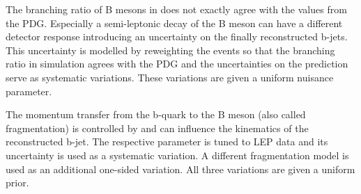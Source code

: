 The branching ratio of B mesons in \PYTHIA does not exactly agree with the values from the PDG. Especially a semi-leptonic decay of the B meson can have a different detector response introducing an uncertainty on
the finally reconstructed b-jets. This uncertainty is modelled by reweighting the events so that the branching ratio in simulation agrees with the PDG and the uncertainties on the prediction serve as systematic
variations. These variations are given a uniform nuisance parameter.

The momentum transfer from the b-quark to the B meson (also called fragmentation) is controlled by \PYTHIA and can influence the kinematics of the reconstructed b-jet. The respective parameter is tuned to LEP data and its uncertainty is used as a systematic variation.
A different fragmentation model is used as an additional one-sided variation. All three variations are given a uniform prior.


